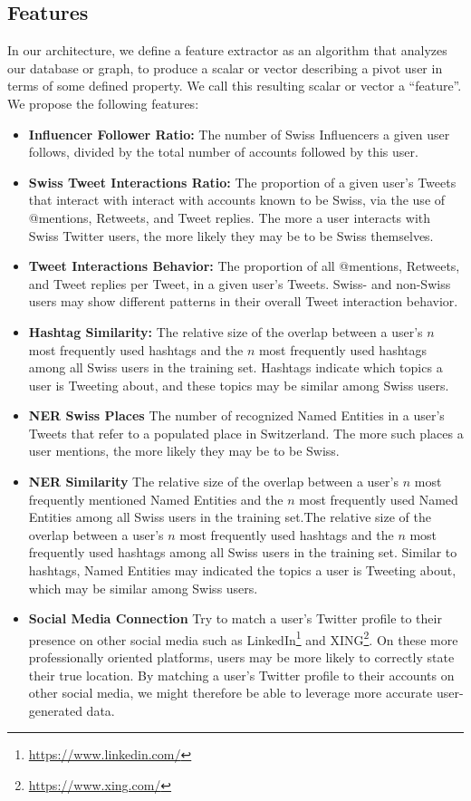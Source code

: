 \documentclass[10pt,a4paper]{article}
\begin{document}
\subsection{Features}
In our architecture, we define a feature extractor as an algorithm that analyzes our database or graph, to produce a scalar or vector describing a pivot user in terms of some defined property. We call this resulting scalar or vector a “feature”. We propose the following features:
\begin{itemize}
\item \textbf{Influencer Follower Ratio:} The number of Swiss Influencers a given user follows, divided by the total number of accounts followed by this user.
\item \textbf{Swiss Tweet Interactions Ratio:} The proportion of a given user's Tweets that interact with interact with accounts known to be Swiss, via the use of @mentions, Retweets, and Tweet replies. The more a user interacts with Swiss Twitter users, the more likely they may be to be Swiss themselves.
\item \textbf{Tweet Interactions Behavior:} The proportion of all @mentions, Retweets, and Tweet replies per Tweet, in a given user's Tweets. Swiss- and non-Swiss users may show different patterns in their overall Tweet interaction behavior.
\item \textbf{Hashtag Similarity:} The relative size of the overlap between a user's $n$ most frequently used hashtags and the $n$ most frequently used hashtags among all Swiss users in the training set. Hashtags indicate which topics a user is Tweeting about, and these topics may be similar among Swiss users.
\item \textbf{NER Swiss Places} The number of recognized Named Entities in a user's Tweets that refer to a populated place in Switzerland. The more such places a user mentions, the more likely they may be to be Swiss.
\item \textbf{NER Similarity} The relative size of the overlap between a user's $n$ most frequently mentioned Named Entities and the $n$ most frequently used Named Entities among all Swiss users in the training set.The relative size of the overlap between a user's $n$ most frequently used hashtags and the $n$ most frequently used hashtags among all Swiss users in the training set. Similar to hashtags, Named Entities may indicated the topics a user is Tweeting about, which may be similar among Swiss users.
\item \textbf{Social Media Connection} Try to match a user's Twitter profile to their presence on other social media such as LinkedIn\footnote{\href{https://www.linkedin.com/}{https://www.linkedin.com/}} and XING\footnote{\href{https://www.xing.com/}{https://www.xing.com/}}. On these more professionally oriented platforms, users may be more likely to correctly state their true location. By matching a user's Twitter profile to their accounts on other social media, we might therefore be able to leverage more accurate user-generated data. 
\end{itemize}
\end{document}
